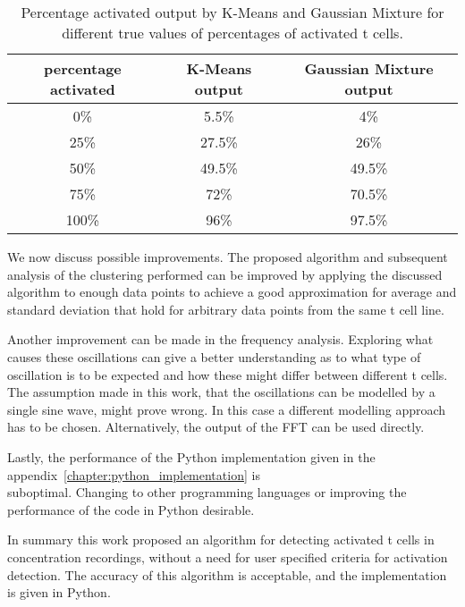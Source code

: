 \begin{table}[h]
	\centering
	\begin{tabular}{|c|c|c|}
		\hline
		percentage activated & K-Means output & Gaussian Mixture output\\
		\hline
		0\% & 5.5\% & 4\%\\
		\hline
		25\% & 27.5\% & 26\%\\
		\hline
		50\% & 49.5\% & 49.5\%\\
		\hline
		75\% & 72\% & 70.5\%\\
		\hline
		100\% & 96\% & 97.5\%\\
		\hline
	\end{tabular}
	\caption{Percentage activated output by K-Means and Gaussian Mixture for different true values of percentages of activated t cells.}
	\label{tab:accuracy}
\end{table}

We now discuss possible improvements. The proposed algorithm and subsequent analysis of the clustering performed can be improved by applying the discussed algorithm to enough data points to achieve a good approximation for average and standard deviation that hold for arbitrary data points from the same t cell line.

Another improvement can be made in the frequency analysis. Exploring what causes these oscillations can give a better understanding as to what type of oscillation is to be expected and how these might differ between different t cells. The assumption made in this work, that the oscillations can be modelled by a single sine wave, might prove wrong. In this case a different modelling approach has to be chosen. Alternatively, the output of the FFT can be used directly.

Lastly, the performance of the Python implementation given in the appendix~\ref{chapter:python_implementation} is\\ suboptimal. Changing to other programming languages or improving the performance of the code in Python desirable.

In summary this work proposed an algorithm for detecting activated t cells in \Calcium concentration recordings, without a need for user specified criteria for activation detection. The accuracy of this algorithm is acceptable, and the implementation is given in Python.